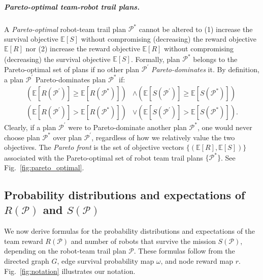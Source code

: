 \documentclass[11pt, oneside]{article}
\begin{document}
\subparagraph{Pareto-optimal team-robot trail plans.} 
A \emph{Pareto-optimal} \cite{pardalos2017non} robot-team trail plan $\mathcal{P}^*$ cannot be altered to
(1) increase the survival objective $\mathbb{E}[S]$ without compromising (decreasing) the reward objective $\mathbb{E}[R]$
nor
(2) increase the reward objective $\mathbb{E}[R]$ without compromising (decreasing) the survival objective $\mathbb{E}[S]$.
Formally, plan $\mathcal{P}^*$ belongs to the Pareto-optimal set of plans if no other plan $\mathcal{P}^\prime$ \emph{Pareto-dominates} it. By definition, a plan $\mathcal{P}^\prime$ Pareto-dominates plan $\mathcal{P}^*$ if:
\begin{align}
	\left (\mathbb{E}[R(\mathcal{P}^\prime)] \geq \mathbb{E}[R(\mathcal{P}^*)]  \right) & \wedge \left( \mathbb{E}[S(\mathcal{P}^\prime)] \geq \mathbb{E}[S(\mathcal{P}^*)] \right) \\
	\left( \mathbb{E}[R(\mathcal{P}^\prime)] > \mathbb{E}[R(\mathcal{P}^*)] \right) & \vee \left( \mathbb{E}[S(\mathcal{P}^\prime)] > \mathbb{E}[S(\mathcal{P}^*)] \right).
\end{align}
Clearly, if a plan $\mathcal{P}^\prime$ were to Pareto-dominate another plan $\mathcal{P}^*$, one would never choose plan $\mathcal{P}^*$ over plan $\mathcal{P}^\prime$, regardless of how we relatively value the two objectives. The \emph{Pareto front} is the set of objective vectors $\{(\mathbb{E}[R], \mathbb{E}[S])\}$ associated with the Pareto-optimal set of robot team trail plans $\{\mathcal{P}^*\}$. See Fig.~\ref{fig:pareto_optimal}. 

\subsection{Probability distributions and expectations of $R(\mathcal{P})$ and $S(\mathcal{P})$}
We now derive formulas for the probability distributions and expectations of the team reward $R(\mathcal{P})$ and number of robots that survive the mission $S(\mathcal{P})$, depending on the robot-team trail plan $\mathcal{P}$. 
These formulas follow from the directed graph $G$, edge survival probability map $\omega$, and node reward map $r$. Fig.~\ref{fig:notation} illustrates our notation.
\end{document}
